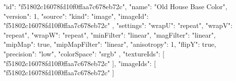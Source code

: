 {
  "id": "f51802c16078fd10f0ffaa7c678eb72c",
  "name": "Old House Base Color",
  "version": 1,
  "source": {
    "kind": "image",
    "imageId": "f51802c16078fd10f0ffaa7c678eb72c"
  },
  "settings": {
    "wrapU": "repeat",
    "wrapV": "repeat",
    "wrapW": "repeat",
    "minFilter": "linear",
    "magFilter": "linear",
    "mipMap": true,
    "mipMapFilter": "linear",
    "anisotropy": 1,
    "flipY": true,
    "precision": "low",
    "colorSpace": "srgb"
  },
  "textureIds": [
    "f51802c16078fd10f0ffaa7c678eb72c"
  ],
  "imageIds": [
    "f51802c16078fd10f0ffaa7c678eb72c"
  ]
}
